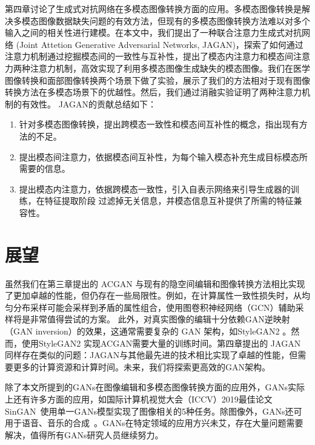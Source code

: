 第四章讨论了生成式对抗网络在多模态图像转换方面的应用。多模态图像转换是解决多模态图像数据缺失问题的有效方法，但现有的多模态图像转换方法难以对多个输入之间的相关性进行建模。在本文中，我们提出了一种联合注意力生成式对抗网络 (Joint Attetion Generative Adversarial Networks, JAGAN)，探索了如何通过注意力机制通过挖掘模态间的一致性与互补性，提出了模态内注意力和模态间注意力两种注意力机制，高效实现了利用多模态图像生成缺失的模态图像。我们在医学图像转换和面部图像转换两个场景下做了实验，展示了我们的方法相对于现有图像转换方法在多模态场景下的优越性。然后，我们通过消融实验证明了两种注意力机制的有效性。
JAGAN的贡献总结如下：
\begin{enumerate}
    \item 针对多模态图像转换，提出跨模态一致性和模态间互补性的概念，指出现有方法的不足。
    \item 提出模态间注意力，依据模态间互补性，为每个输入模态补充生成目标模态所需要的信息。
    \item 提出模态内注意力，依据跨模态一致性，引入自表示网络来引导生成器的训练，在特征提取阶段 过滤掉无关信息，并模态信息互补提供了所需的特征兼容性。
\end{enumerate}

\section{展望}

虽然我们在第三章提出的 ACGAN 与现有的隐空间编辑和图像转换方法相比实现了更加卓越的性能，但仍存在一些局限性。例如，在计算属性一致性损失时，从均匀分布采样可能会采样到矛盾的属性组合，使用图卷积神经网络（GCN）辅助采样将是非常值得尝试的方案。 此外，对真实图像的编辑十分依赖GAN逆映射（GAN inversion）的效果，这通常需要复杂的 GAN 架构，如StyleGAN2 。然而，使用StyleGAN2 实现ACGAN需要大量的训练时间。第四章提出的 JAGAN 同样存在类似的问题：JAGAN与其他最先进的技术相比实现了卓越的性能，但需要更多的计算资源和计算时间。未来，我们将探索更高效的GAN架构。

除了本文所提到的GANs在图像编辑和多模态图像转换方面的应用外，GANs实际上还有许多方面的应用，如国际计算机视觉大会（ICCV）2019最佳论文SinGAN~\cite{singan}使用单一GANs模型实现了图像相关的5种任务。除图像外，GANs还可用于语音、音乐的合成~\cite{voice1,voice2,voice3}。GANs在特定领域的应用方兴未艾，存在大量问题需要解决，值得所有GANs研究人员继续努力。